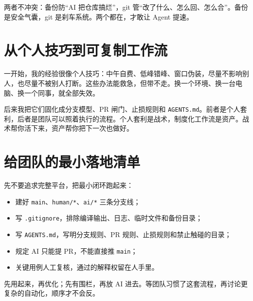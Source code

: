 两者不冲突：备份防“AI 把仓库搞烂”，git 管“改了什么、怎么回、怎么合”。备份是安全气囊，git 是刹车系统。两个都在，才敢让 Agent 提速。

\section{从个人技巧到可复制工作流}

一开始，我的经验很像个人技巧：中午自费、低峰错峰、窗口伪装，尽量不影响别人，也尽量不被别人打断。这些办法能救急，但带不走。换一个环境、换一台电脑、换一个同事，就全部失效。

后来我把它们固化成分支模型、PR 闸门、止损规则和 \texttt{AGENTS.md}。前者是个人套利，后者是团队可以照着执行的流程。个人套利是战术，制度化工作流是资产。战术帮你活下来，资产帮你把下一次也做好。

\section{给团队的最小落地清单}

先不要追求完整平台，把最小闭环跑起来：

\begin{itemize}
\item 建好 \texttt{main}、\texttt{human/*}、\texttt{ai/*} 三条分支线；
\item 写 \texttt{.gitignore}，排除编译输出、日志、临时文件和备份目录；
\item 写 \texttt{AGENTS.md}，写明分支规则、PR 规则、止损规则和禁止触碰的目录；
\item 规定 AI 只能提 PR，不能直接推 \texttt{main}；
\item 关键用例人工复核，通过的解释权留在人手里。
\end{itemize}

先用起来，再优化；先有围栏，再放 AI 进去。等团队习惯了这套流程，再讨论更复杂的自动化，顺序才不会反。
